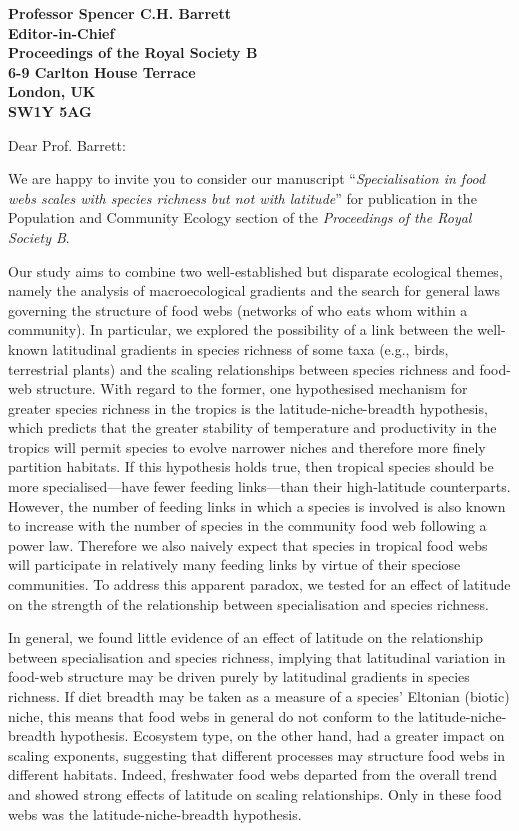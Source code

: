 \documentclass[12pt]{letter}
\newcommand{\mytitle}{\emph{Specialisation in food webs scales with species richness but not with latitude}}
\newcommand{\myjournal}{\emph{Proceedings of the Royal Society B}}
\begin{document}
\begin{letter}{\bf Professor Spencer C.H. Barrett\\
               Editor-in-Chief\\
               Proceedings of the Royal Society B\\
               6-9 Carlton House Terrace\\
               London, UK\\
               SW1Y 5AG\\
                }

\opening{Dear Prof. Barrett:}

We are happy to invite you to consider our manuscript 
``\mytitle'' for publication in the Population and Community Ecology section of the \myjournal. 

Our study aims to combine two well-established but disparate ecological
themes, namely the analysis of macroecological gradients and the search for
general laws governing the structure of food webs (networks of who eats whom
within a community). In particular, we explored the possibility of a link
between the well-known latitudinal gradients in species richness of some taxa
(e.g., birds, terrestrial plants) and the scaling relationships between
species richness and food-web structure. With regard to the former, one
hypothesised mechanism for greater species richness in the tropics is the
latitude-niche-breadth hypothesis, which predicts that the greater stability
of temperature and productivity in the tropics will permit species to evolve
narrower niches and therefore more finely partition habitats. If this
hypothesis holds true, then tropical species should be more specialised---have
fewer feeding links---than their high-latitude counterparts. However, the
number of feeding links in which a species is involved is also known to
increase with the number of species in the community food web following a
power law. Therefore we also naively expect that species in tropical food webs
will participate in relatively many feeding links by virtue of their speciose
communities. To address this apparent paradox, we tested for an effect of
latitude on the strength of the relationship between specialisation and species 
richness.


In general, we found little evidence of an effect of latitude on the
relationship between specialisation and species richness, implying that
latitudinal variation in food-web structure may be driven purely by
latitudinal gradients in species richness. If diet breadth may be taken as a
measure of a species' Eltonian (biotic) niche, this means that food webs
in general do not conform to the latitude-niche-breadth hypothesis. Ecosystem
type, on the other hand, had a greater impact on scaling exponents, suggesting
that different processes may structure food webs in different habitats.
Indeed, freshwater food webs departed from the overall trend and showed strong
effects of latitude on scaling relationships. Only in these food webs was the
latitude-niche-breadth hypothesis.



\end{letter}
\end{document}

